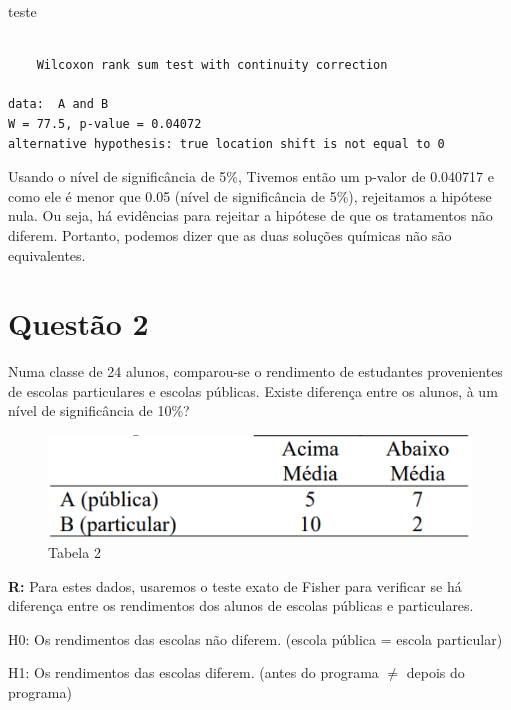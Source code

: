\documentclass[
  letterpaper,
  DIV=11,
  numbers=noendperiod]{scrartcl}
\newenvironment{Shaded}{\begin{snugshade}}{\end{snugshade}}
\newcommand{\NormalTok}[1]{\textcolor[rgb]{0.00,0.23,0.31}{#1}}
\begin{document}
\begin{Shaded}
\begin{Highlighting}[]
\NormalTok{teste}
\end{Highlighting}
\end{Shaded}

\begin{verbatim}

    Wilcoxon rank sum test with continuity correction

data:  A and B
W = 77.5, p-value = 0.04072
alternative hypothesis: true location shift is not equal to 0
\end{verbatim}

Usando o nível de significância de 5\%, Tivemos então um p-valor de
0.040717 e como ele é menor que 0.05 (nível de significância de 5\%),
rejeitamos a hipótese nula. Ou seja, há evidências para rejeitar a
hipótese de que os tratamentos não diferem. Portanto, podemos dizer que
as duas soluções químicas não são equivalentes.

\section{Questão 2}\label{questuxe3o-2}

Numa classe de 24 alunos, comparou-se o rendimento de estudantes
provenientes de escolas particulares e escolas públicas. Existe
diferença entre os alunos, à um nível de significância de 10\%?

\begin{figure}[H]

{\centering \includegraphics{imgs/q2-tabela.png}

}

\caption{Tabela 2}

\end{figure}%

\textbf{R:} Para estes dados, usaremos o teste exato de Fisher para
verificar se há diferença entre os rendimentos dos alunos de escolas
públicas e particulares.

H0: Os rendimentos das escolas não diferem. (escola pública = escola
particular)

H1: Os rendimentos das escolas diferem. (antes do programa \(\neq\)
depois do programa)
\end{document}
